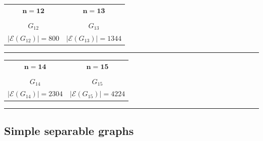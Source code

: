 \documentclass{article}
\newcommand{\Gtwelve}{
\begin{tikzpicture}[scale=0.8]
    \node[cvertex]     (3)  at (-1.8, 0) {};
    \node[cvertex] (10) at (1.8, 0) {};

    \node[cvertex] (1) at (0, 1.4) {};
    \node[cvertex]        (5) at (-1.2, 1.7) {};
    \node[cvertex]       (7) at (1.2, 1.7) {};
    \node[cvertex]       (9) at (0, 2.2) {};

    \node[cvertex]  (2)  at (-1.0, -0.8) {};
    \node[cvertex] (4)  at (1.3, -0.8) {};
    \node[cvertex]        (6)  at (-1.4, -1.8) {};
    \node[cvertex]    (11) at (1.4, -1.8) {};
    \node[cvertex]       (8)  at (-0.6, -2.6) {};
    \node[cvertex]    (12) at (0.6, -2.6) {};

    \draw[thick]
        (1)--(5) (1)--(7) (1)--(9) 
        (5)--(7) (5)--(9) 
        (7)--(9)
        
        (2)--(6) (2)--(8) (2)--(11) (2)--(12)
        (4)--(8) (4)--(11) (4)--(12)
        (6)--(8) (6)--(11) (6)--(12)
        (8)--(12)
        
        (3)--(7) (3)--(9) 
        (3)--(11)
        
        (10)--(1) (10)--(5)
        (10)--(4)
        
        (3)--(10);
\end{tikzpicture}
}
\newcommand{\Gthirteen}{
\begin{tikzpicture}[scale=0.8]
    \node[cvertex]  (3) at (-1.8, 0) {};
    \node[cvertex] (6) at (1.8, 0) {};

    \node[cvertex]     (9)  at (-0.8, 0.8) {};
    \node[cvertex] (12) at (0.8, 0.8) {};
    \node[cvertex]           (1)  at (-1.4, 1.6) {};
    \node[cvertex]          (4)  at (1.4, 1.6) {};
    \node[cvertex]  (13) at (-0.6, 2.4) {};
    \node[cvertex]    (7)  at (0.6, 2.4) {};

    \node[cvertex]          (8)  at (0, -1.0) {};
    \node[cvertex]        (10) at (-1.4, -1.6) {};
    \node[cvertex]       (11) at (1.4, -1.6) {};
    \node[cvertex]     (2)  at (-0.6, -2.4) {};
    \node[cvertex]    (5)  at (0.6, -2.4) {};

    \draw[thick]
        (1)--(4) (1)--(7) (1)--(9) (1)--(13)
        (4)--(7) (4)--(12) (4)--(13)
        (7)--(12) (7)--(13)
        (9)--(13)
        
        (2)--(5) (2)--(8) (2)--(10) (2)--(11)
        (5)--(8) (5)--(10) (5)--(11)
        (8)--(10) (8)--(11)
        
        (3)--(9) (3)--(12) 
        (3)--(10)
        
        (6)--(9) (6)--(12) 
        (6)--(11)
        
        (3)--(6);
\end{tikzpicture}
}
\newcommand{\Gfourteen}{
\begin{tikzpicture}[scale=0.8]
    \node[cvertex]  (10) at (-2.0, -0.3) {};
    \node[cvertex] (13) at (2.0, -0.3) {};

    \node[cvertex]    (6)  at (-1.2, 0.5) {};
    \node[cvertex]   (2)  at (1.2, 0.5) {};
    \node[cvertex] (12) at (-1.2, 1) {};
    \node[cvertex](11) at (1.2, 1) {};
    \node[cvertex]   (1)  at (-1, 1.6) {};
    \node[cvertex]   (5)  at (0, 2.2) {};
    \node[cvertex]   (7)  at (1, 1.6) {};

    \node[cvertex]    (3)  at (-1.2, -0.8) {};
    \node[cvertex]   (4)  at (1.2, -0.8) {};
    \node[cvertex]   (8)  at (-0.8, -2.2) {};
    \node[cvertex]   (9)  at (0, -1) {};
    \node[cvertex]  (14) at (0.8, -2.2) {};

    \draw[thick]
        (2)--(6)
        (6)--(12) (2)--(11)
        (1)--(12) (1)--(11)
        (5)--(12) (5)--(11)
        (7)--(12) (7)--(11)
        (1)--(5) (1)--(7) (5)--(7)
        
        (3)--(8) (3)--(9) (3)--(14)
        (4)--(8) (4)--(9) (4)--(14)
        (8)--(9) (8)--(14) (9)--(14)
        
        (10)--(2) (10)--(6) (10)--(3)
        (13)--(2) (13)--(6) (13)--(4)
        
        (10)--(13);
\end{tikzpicture}
}
\newcommand{\Gfifteen}{
\begin{tikzpicture}[scale=0.8]
    \node[cvertex]    (8)  at (0, 1.2) {};
    \node[cvertex] (14) at (-1.8, -0) {};
    \node[cvertex]    (4)  at (1.8, -0.) {};

    \node[cvertex]    (1)  at (2.5, 2.2) {};
    \node[cvertex]   (5)  at (3.5, 2.2) {};
    \node[cvertex]    (9)  at (2.5, 1.5) {};
    \node[cvertex](12) at (3.5, 1.5) {};

    \node[cvertex](10) at (-2.5, 2.2) {};
    \node[cvertex] (13) at (-3.5, 2.2) {};
    \node[cvertex]   (6)  at (-2.5, 1.5) {};
    \node[cvertex]    (2)  at (-3.5, 1.5) {};

    \node[cvertex]    (3)  at (-0.5, -1.5) {};
    \node[cvertex]    (7)  at (-0.5, -2.1) {};
    \node[cvertex](11) at (0.5, -1.5) {};
    \node[cvertex](15) at (0.5, -2.1) {};

    \draw[thick]
        (1)--(5) (1)--(12) (1)--(9) 
        (5)--(12) (5)--(9) 
        (12)--(9)
        
        (13)--(10) (13)--(2) (13)--(6) 
        (10)--(2) (10)--(6) 
        (2)--(6)
        
        (3)--(11) (3)--(7) (3)--(15) 
        (11)--(7) (11)--(15) 
        (7)--(15)
        
        (8)--(1)  (8)--(5)
        (8)--(10) (8)--(13)
        
        (14)--(2) (14)--(6)
        (14)--(3) (14)--(7)

        (4)--(9)  (4)--(12)
        (4)--(11) (4)--(15);
\end{tikzpicture}
}
\begin{document}
\begin{center}
            \begin{tabular}{cc}
                $\bm{n=12}$  \hspace{5mm} & \hspace{5mm} $\bm{n=13}$ \vspace{2mm}\\
                \Gtwelve    \hspace{5mm} &  \hspace{5mm} \Gthirteen  \\
                $G_{12}$  \hspace{5mm} & \hspace{5mm} $G_{13}$ \vspace{1.5mm}\\
                $|\mathcal{E}(G_{12})| =800 $  \hspace{5mm} & \hspace{5mm} $|\mathcal{E}(G_{13})| =1344 $ \vspace{1.5mm}\\
            \end{tabular}
            \noindent\rule{\textwidth}{0.4pt}
            \bigskip

            \begin{tabular}{cc}
                $\bm{n=14}$  \hspace{5mm} & \hspace{5mm} $\bm{n=15}$ \vspace{2mm}\\
                \Gfourteen    \hspace{5mm} &  \hspace{5mm} \Gfifteen  \\
                $G_{14}$  \hspace{5mm} & \hspace{5mm} $G_{15}$ \vspace{1.5mm}\\
                $|\mathcal{E}(G_{14})| =2304 $  \hspace{5mm} & \hspace{5mm} $|\mathcal{E}(G_{15})| =4224 $ \vspace{1.5mm}\\
            \end{tabular}
            \noindent\rule{\textwidth}{0.4pt}
            \bigskip
                    
        \end{center}

    \subsection{Simple separable graphs}\label{app:simple_sep}
\end{document}
